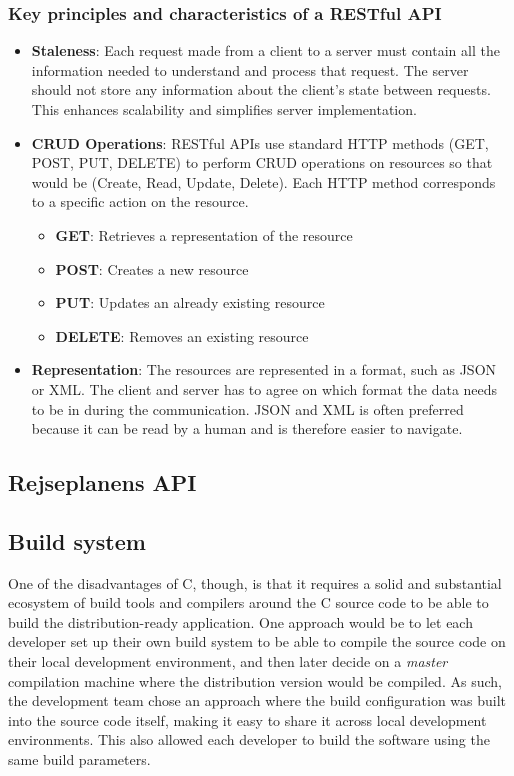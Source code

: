 \subsubsection{Key principles and characteristics of a RESTful API}
\label{subsubsec:key-principles-and-characteristics-of-a-restful-api}
\begin{itemize}
    \item \textbf{Staleness}: Each request made from a client to a server must contain all the information needed to
    understand and process that request.
    The server should not store any information about the client's state between requests.
    This enhances scalability and simplifies server implementation.
    \item \textbf{CRUD Operations}: RESTful APIs use standard HTTP methods (GET, POST, PUT, DELETE) to perform CRUD
    operations on resources so that would be (Create, Read, Update, Delete).
    Each HTTP method corresponds to a specific action on the resource.
    \begin{itemize}
        \item \textbf{GET}: Retrieves a representation of the resource
        \item \textbf{POST}: Creates a new resource
        \item \textbf{PUT}: Updates an already existing resource
        \item \textbf{DELETE}: Removes an existing resource
    \end{itemize}
    \item \textbf{Representation}: The resources are represented in a format, such as JSON or XML.
    The client and server has to agree on which format the data needs to be in during the communication.
    JSON and XML is often preferred because it can be read by a human and is therefore easier to navigate.
\end{itemize}

\subsection{Rejseplanens API}\label{subsec:rejseplanens-api}

\subsection{Build system}\label{subsec:build-system}

One of the disadvantages of C, though, is that it requires a solid and substantial ecosystem of build tools and
compilers around the C source code to be able to build the distribution-ready application.
One approach would be to let each developer set up their own build system to be able to compile the source code on their
local development environment, and then later decide on a \textit{master} compilation machine where the distribution
version would be compiled.
As such, the development team chose an approach where the build configuration was built into the source code itself,
making it easy to share it across local development environments.
This also allowed each developer to build the software using the same build parameters.

